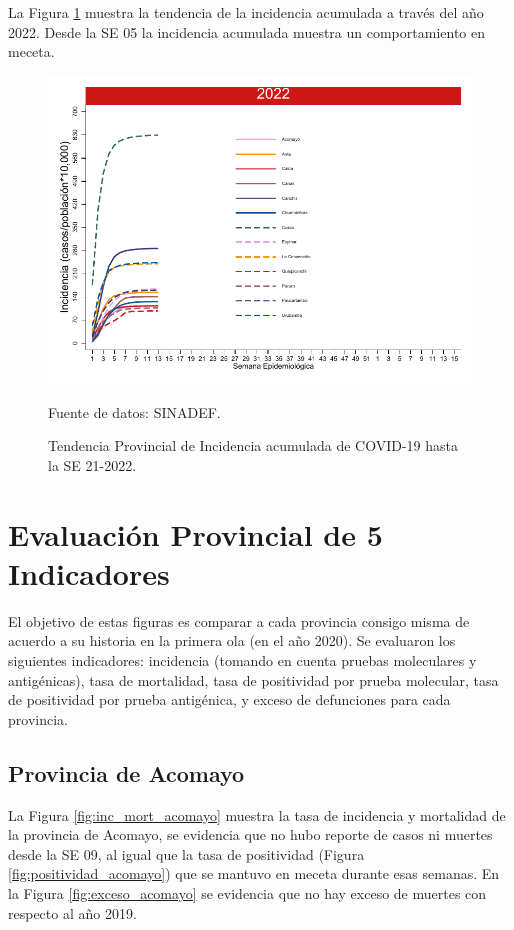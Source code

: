 \documentclass[12pt,a4paper,openany]{book}
\begin{document}
	La Figura \ref{fig:incidencia_provincial} muestra la tendencia de la incidencia acumulada a través del año 2022. Desde la SE 05 la incidencia acumulada muestra un comportamiento en meceta. 
	\begin{figure}[h]
		\caption{Tendencia Provincial de Incidencia acumulada de COVID-19 hasta la SE 21-2022. }\label{fig:incidencia_provincial}
		\begin{center}
			\includegraphics[width=0.60\linewidth]{../figuras/incidencia_provincial_acumulada_2022.pdf}
		\end{center}
		{\footnotesize {Fuente de datos: SINADEF.}}
	\end{figure}
	
	\clearpage
	
	\section*{Evaluación Provincial de 5 Indicadores}
	\noindent El objetivo de estas figuras es comparar a cada provincia consigo misma de acuerdo a su historia  en la primera ola (en el año 2020). Se evaluaron los siguientes indicadores: incidencia (tomando en cuenta pruebas moleculares y antigénicas), tasa de mortalidad, tasa de positividad por prueba molecular, tasa de positividad por prueba antigénica, y exceso de defunciones para cada provincia.
	
	\subsection*{Provincia de Acomayo}
	\noindent La Figura \ref{fig:inc_mort_acomayo} muestra la tasa de incidencia y mortalidad de la provincia de Acomayo, se evidencia que no hubo reporte de casos ni muertes desde la SE 09, al igual que la tasa de positividad (Figura \ref{fig:positividad_acomayo}) que se mantuvo en meceta durante esas semanas.  
	En la Figura \ref{fig:exceso_acomayo} se evidencia que no hay exceso de muertes con respecto al año 2019.
	
\end{document}
